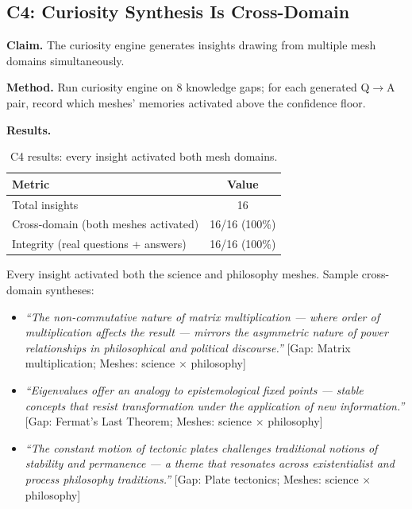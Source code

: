\documentclass[11pt]{article}
\begin{document}
\subsection{C4: Curiosity Synthesis Is Cross-Domain}

\textbf{Claim.} The curiosity engine generates insights drawing from multiple
mesh domains simultaneously.

\textbf{Method.} Run curiosity engine on 8 knowledge gaps; for each generated
Q$\to$A pair, record which meshes' memories activated above the confidence
floor.

\textbf{Results.}

\begin{table}[h]
\centering
\begin{tabular}{lc}
\toprule
Metric & Value \\
\midrule
Total insights & 16 \\
Cross-domain (both meshes activated) & 16/16 (100\%) \\
Integrity (real questions + answers) & 16/16 (100\%) \\
\bottomrule
\end{tabular}
\caption{C4 results: every insight activated both mesh domains.}
\end{table}

Every insight activated both the science and philosophy meshes. Sample
cross-domain syntheses:

\begin{itemize}
  \item \textit{``The non-commutative nature of matrix multiplication --- where
        order of multiplication affects the result --- mirrors the asymmetric
        nature of power relationships in philosophical and political discourse.''}
        [Gap: Matrix multiplication; Meshes: science $\times$ philosophy]

  \item \textit{``Eigenvalues offer an analogy to epistemological fixed points ---
        stable concepts that resist transformation under the application of new
        information.''}
        [Gap: Fermat's Last Theorem; Meshes: science $\times$ philosophy]

  \item \textit{``The constant motion of tectonic plates challenges traditional
        notions of stability and permanence --- a theme that resonates across
        existentialist and process philosophy traditions.''}
        [Gap: Plate tectonics; Meshes: science $\times$ philosophy]
\end{itemize}
\end{document}
